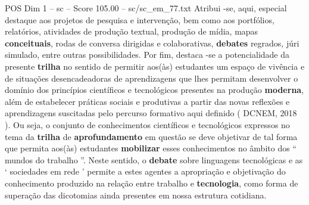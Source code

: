 \begin{textsample}{POS Dim 1 – sc – Score 105.00 – sc/sc\_em\_77.txt}
Atribui -se, aqui, especial destaque aos projetos de pesquisa e intervenção, bem como aos portfólios, relatórios, atividades de produção textual, produção de mídia, mapas \textbf{conceituais}, rodas de conversa dirigidas e colaborativas, \textbf{debates} regrados, júri simulado, entre outras possibilidades.
Por fim, destaca -se a potencialidade da presente \textbf{trilha} no sentido de permitir aos(às) estudantes um espaço de vivência e de situações desencadeadoras de aprendizagens que lhes permitam desenvolver o domínio dos princípios científicos e tecnológicos presentes na produção \textbf{moderna}, além de estabelecer práticas sociais e produtivas a partir das novas reflexões e aprendizagens suscitadas pelo percurso formativo aqui definido ( DCNEM, 2018 ).
Ou seja, o conjunto de conhecimentos científicos e tecnológicos expressos no tema da \textbf{trilha} de \textbf{aprofundamento} em questão se deve objetivar de tal forma que permita aos(às) estudantes \textbf{mobilizar} esses conhecimentos no âmbito dos “ mundos do trabalho ”.
Neste sentido, o \textbf{debate} sobre linguagens tecnológicas e as ‘ sociedades em rede ’ permite a estes agentes a apropriação e objetivação do conhecimento produzido na relação entre trabalho e \textbf{tecnologia}, como forma de superação das dicotomias ainda presentes em nossa estrutura cotidiana.

\end{textsample}
